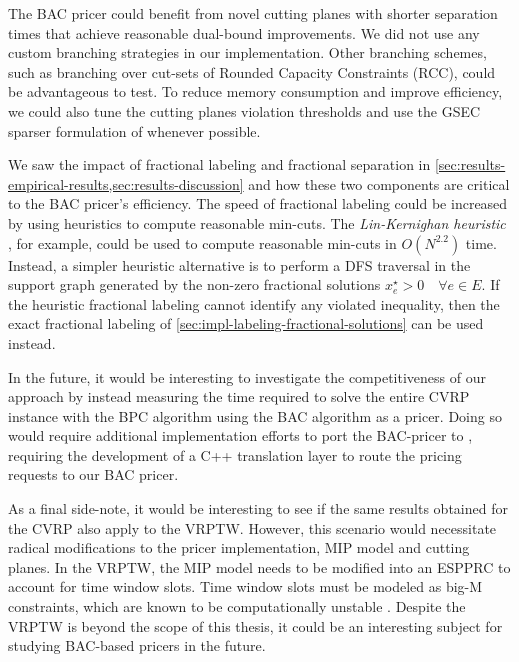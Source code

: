 The BAC pricer could benefit from novel cutting planes with shorter separation times that achieve reasonable dual-bound improvements.
We did not use any custom branching strategies in our implementation.
Other branching schemes, such as branching over cut-sets of Rounded Capacity Constraints (RCC), could be advantageous to test.
To reduce memory consumption and improve efficiency, we could also tune the cutting planes violation thresholds and use the GSEC sparser formulation of  whenever possible.


We saw the impact of fractional labeling and fractional separation in \cref{sec:results-empirical-results,sec:results-discussion} and how these two components are critical to the BAC pricer's efficiency.
The speed of fractional labeling could be increased by using heuristics to compute reasonable min-cuts.
The \textit{Lin-Kernighan heuristic} \parencite{kernighan1970}, for example, could be used to compute reasonable min-cuts in $O(N^{2.2})$ time.
Instead, a simpler heuristic alternative is to perform a DFS traversal in the support graph generated by the non-zero fractional solutions $x^\star_e > 0 \quad \forall e \in E$.
If the heuristic fractional labeling cannot identify any violated inequality, then the exact fractional labeling of \cref{sec:impl-labeling-fractional-solutions} can be used instead.


\medskip

In the future, it would be interesting to investigate the competitiveness of our approach by instead measuring the time required to solve the entire CVRP instance with the BPC algorithm using the BAC algorithm as a pricer.
Doing so would require additional implementation efforts to port the BAC-pricer to \bapcod{}, requiring the development of a C++ translation layer to route the \bapcod{} pricing requests to our BAC pricer.

As a final side-note, it would be interesting to see if the same results obtained for the CVRP also apply to the VRPTW.
However, this scenario would necessitate radical modifications to the pricer implementation, MIP model and cutting planes.
In the VRPTW, the MIP model needs to be modified into an ESPPRC to account for time window slots.
Time window slots must be modeled as big-M constraints, which are known to be computationally unstable \parencite{jepsen2008branchandcut}.
Despite the VRPTW is beyond the scope of this thesis, it could be an interesting subject for studying BAC-based pricers in the future.
